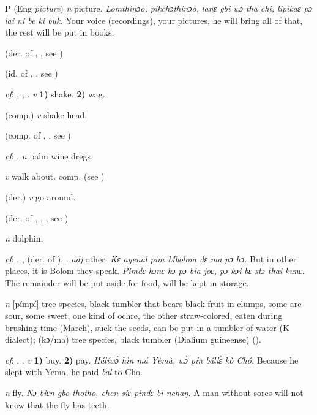 \begin{letter}{P}
 (Eng \textit{picture}) \textit{n} picture. \textit{Lomthinɔo, pikchɔthinɔo, lanɛ gbi wɔ tha chi, lipikaɛ pɔ lai ni be ki buk.} Your voice (recordings), your pictures, he will bring all of that, the rest will be put in books.

 (der. of , , see )

 (id. of , , see ) 

 \textit{cf}: , , . \textit{v} \textbf{1)} shake. \textbf{2)} wag.

 (comp.) \textit{v} shake head.

 (comp. of , , see ) 

 \textit{cf}: . \textit{n} palm wine dregs.

 \textit{v} walk about. comp.  (see )

 (der.) \textit{v} go around.

 (der. of , , , see ) 

 \textit{n} dolphin.

 \textit{cf}: , ,  (der. of ), . \textit{adj} other. \textit{Kɛ ayenal pim Mbolom dɛ ma pɔ hɔ.} But in other places, it is Bolom they speak. \textit{Pimdɛ kɔnɛ kɔ pɔ bia joɛ, pɔ kɔi bɛ stɔ thai kunɛ.} The remainder will be put aside for food, will be kept in storage.

 \textit{n} [pímpí] tree species, black tumbler that bears black fruit in clumps, some are sour, some sweet, one kind of ochre, the other straw-colored, eaten during brushing time (March), suck the seeds, can be put in a tumbler of water (K dialect); (kɔ/ma) tree species, black tumbler (Dialium guineense) (\citealt{Pichl1967}). 

 \textit{cf}: , . \textit{v} \textbf{1)} buy. \textbf{2)} pay. \textit{Hálíwɔ̀ hìn má Yèmà, wɔ̀ pín bállɛ̀ kò Chó.} Because he slept with Yema, he paid \textit{bal} to Cho.

 \textit{n} fly. \textit{Nɔ biɛn gbo thotho, chen siɛ pindɛ bi nchaŋ.} A man without sores will not know that the fly has teeth.


\end{letter}
